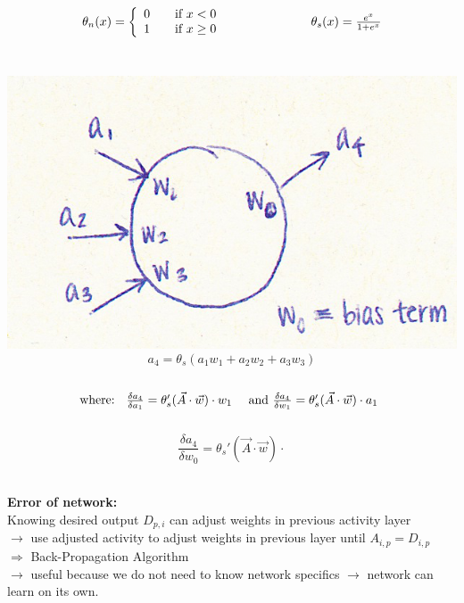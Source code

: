 \documentclass[english,11pt]{article}
\begin{document}
\begin{equation}
\begin{array}[width=1\textwidth]{lr}
\theta_n(x) = \left\{  \begin{array}{l l} 0 & \quad \text{if } x < 0\\1 &  \quad\text{if } x \ge 0 \end{array}\quad\quad\quad\quad \right.\quad & \quad\theta_s(x) =   \frac{e^x}{1+e^x} 
\end{array}
\end{equation}\\
\begin{center}
\includegraphics[]{fnn_node.png}\\
\begin{equation}
a_4 = \theta_s (a_1w_1 + a_2w_2 + a_3w_3)
\end{equation}\\
\begin{equation}
\text{where: }\begin{array}[width=1\textwidth]{lr}
\frac{\delta a_4}{\delta a_1}= \theta_s'(\vec{A}\cdot\vec{w})\cdot w_1 & \text{ and } \frac{\delta a_4}{\delta w_1}= \theta_s'(\vec{A}\cdot\vec{w})\cdot a_1
\end{array}
\end{equation}\\

\begin{equation}
\frac{\delta a_4}{\delta w_0} = \theta_s'(\vec{A}\cdot\vec{w})\cdot
\end{equation}\\
\end{center}

\textbf{Error of network:}\\
Knowing desired output $D_{p,i}$ can adjust weights in previous activity layer\\
$\rightarrow$ use adjusted activity to adjust weights in previous layer until $A_{i,p}=D_{i,p}$\\
$\Longrightarrow$ Back-Propagation Algorithm\\
$\rightarrow$ useful because we do not need to know network specifics $\rightarrow$ network can learn on its own.\\
\end{document}
